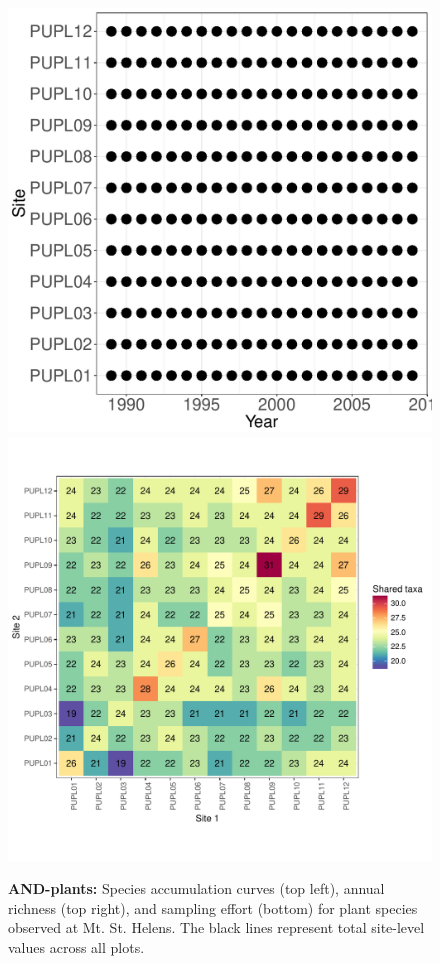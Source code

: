 \documentclass[11pt, oneside]{article}
\begin{document}
\begin{figure}[h!]
\includegraphics[scale = 0.4]{and-plants-mtStHelens_spatiotemporal_sampling_effort.pdf}
\includegraphics[scale = 0.4]{and-plants-mtStHelens_spp_shared.pdf}
\caption{{\bf AND-plants:} Species accumulation curves (top left),  annual richness (top right), and sampling effort (bottom)  for plant species observed at Mt. St. Helens. The black lines represent total site-level values across all plots.}
\label{and-plants}
\end{figure}
\end{document}
